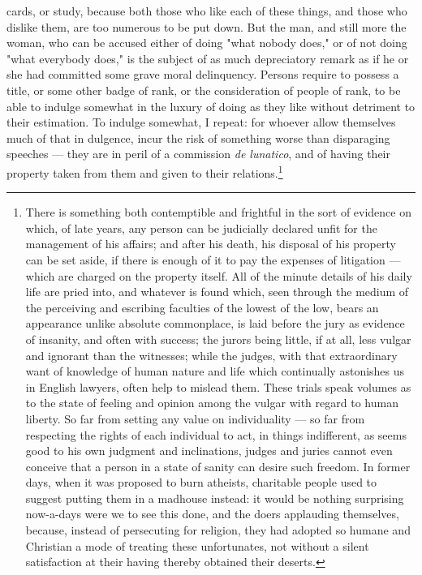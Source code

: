 \documentclass[12pt]{report}
\begin{document}
cards, or study, because both those who like each of these things, and those who dislike them, are too numerous to be put down. But the man, and still more the woman, who can be accused either of doing "what nobody does," or of not doing "what everybody does," is the subject of as much depreciatory remark as if he or she had committed some grave moral delinquency. Persons require to possess a title, or some other badge of rank, or the consideration of people of rank, to be able to indulge somewhat in the luxury of doing as they like without detriment to their estimation. To indulge somewhat, I repeat: for whoever allow themselves much of that in dulgence, incur the risk of something worse than disparaging speeches — they are in peril of a commission \emph{de lunatico}, and of having their property taken from them and given to their relations.\footnote{There is something both contemptible and frightful in the sort of evidence on which, of late years, any person can be judicially declared unfit for the management of his affairs; and after his death, his disposal of his property can be set aside, if there is enough of it to pay the expenses of litigation — which are charged on the property itself. All of the minute details of his daily life are pried into, and whatever is found which, seen through the medium of the perceiving and escribing faculties of the lowest of the low, bears an appearance unlike absolute commonplace, is laid before the jury as evidence of insanity, and often with success; the jurors being little, if at all, less vulgar and ignorant than the witnesses; while the judges, with that extraordinary want of knowledge of human nature and life which continually astonishes us in English lawyers, often help to mislead them. These trials speak volumes as to the state of feeling and opinion among the vulgar with regard to human liberty. So far from setting any value on individuality — so far from respecting the rights of each individual to act, in things indifferent, as seems good to his own judgment and inclinations, judges and juries cannot even conceive that a person in a state of sanity can desire such freedom. In former days, when it was proposed to burn atheists, charitable people used to suggest putting them in a madhouse instead: it would be nothing surprising now-a-days were we to see this done, and the doers applauding themselves, because, instead of persecuting for religion, they had adopted so humane and Christian a mode of treating these unfortunates, not without a silent satisfaction at their having thereby obtained their deserts.}
\end{document}
